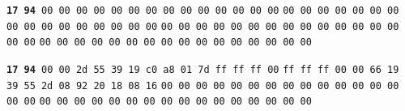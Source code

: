 \documentclass[11pt, oneside]{article}
\begin{document}
\texttt{{\color{blue}\textbf{17}} 
{\color{red}\textbf{94}} 
00 00 00 00 00 00  00 00 00 00 00 00 00 00}\newline
\texttt{00 00 00 00 00 00 00 00  00 00 00 00 00 00 00 00}\newline
\texttt{00 00 00 00 00 00 00 00  00 00 00 00 00 00 00 00}\newline
\texttt{00 00 00 00 00 00 00 00  00 00 00 00 00 00 00 00}\newline

\texttt{{\color{blue}\textbf{17}} 
{\color{red}\textbf{94}} 
00 00 2d 55 39 19  c0 a8 01 7d ff ff ff 00}\newline
\texttt{ff ff ff 00 00 66 19 39  55 2d 08 92 20 18 08 16}\newline
\texttt{00 00 00 00 00 00 00 00  00 00 00 00 00 00 00 00}\newline
\texttt{00 00 00 00 00 00 00 00  00 00 00 00 00 00 00 00}\newline



\end{document}
